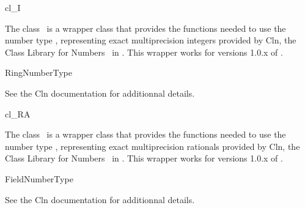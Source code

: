 
\ccDefGlobalScope{}
\begin{ccRefClass}{cl_I}

\ccDefinition

The class \ccRefName\ is a wrapper class that provides the functions needed to 
use the number type , representing exact multiprecision 
integers provided by {\sc Cln}, the Class Library 
for Numbers~\cite{cln} in \cgal.  This wrapper works for versions 1.0.x 
of .


\ccIsModel
RingNumberType

See the {\sc Cln} documentation for additionnal details.

\end{ccRefClass}

\begin{ccRefClass}{cl_RA}

\ccDefinition

The class \ccRefName\ is a wrapper class that provides the functions needed to 
use the number type , representing exact multiprecision 
rationals provided by {\sc Cln}, the Class Library 
for Numbers~\cite{cln} in \cgal.  This wrapper works for versions 1.0.x 
of .


\ccIsModel
FieldNumberType

See the {\sc Cln} documentation for additionnal details.

\end{ccRefClass}
